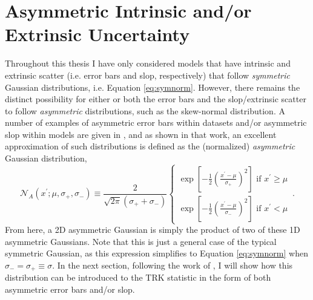 \section{Asymmetric Intrinsic and/or Extrinsic Uncertainty}
\label{sec:asymm}
Throughout this thesis I have only considered models that have intrinsic and extrinsic scatter (i.e. error bars and slop, respectively) that follow \textit{symmetric} Gaussian distributions, i.e. Equation \eqref{eq:symnorm}. However, there remains the distinct possibility for either or both the error bars and the slop/extrinsic scatter to follow \textit{asymmetric} distributions, such as the skew-normal distribution. A number of examples of asymmetric error bars within datasets and/or asymmetric slop within models are given in \textcite{trotter}, and as shown in that work, an excellent approximation of such distributions is defined as the (normalized) \textit{asymmetric} Gaussian distribution,
\begin{equation}
\label{eq:asymnorm}
\mathcal{N}_A(x^\prime;\mu,\sigma_{+},\sigma_-) \equiv \frac{2}{\sqrt{2\pi}(\sigma_{+} +\sigma_{-})} \left\{ \begin{array} {lr}
\exp{\left[-\frac{1}{2}\left(\frac{x^\prime-\mu}{\sigma_{+}}\right)^2\right]}\,\, \mbox{if $x^\prime\geq \mu$} \\
\exp{\left[-\frac{1}{2}\left(\frac{x^\prime-\mu}{\sigma_{-}}\right)^2\right]}\,\, \mbox{if $x^\prime < \mu$} \end{array} \right. \, .
\end{equation}
From here, a 2D asymmetric Gaussian is simply the product of two of these 1D asymmetric Gaussians. Note that this is just a general case of the typical symmetric Gaussian, as this expression simplifies to Equation \eqref{eq:symnorm} when $\sigma_-=\sigma_+\equiv\sigma$.
In the next section, following the work of \textcite{trotter}, I will show how this distribution can be introduced to the TRK statistic in the form of both asymmetric error bars and/or slop.

